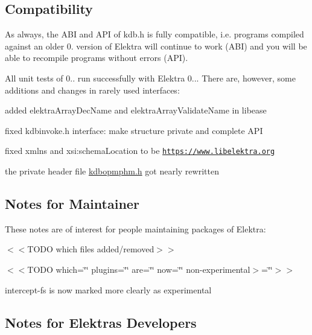 \subsection*{Compatibility}

As always, the A\+BI and A\+PI of kdb.\+h is fully compatible, i.\+e. programs compiled against an older 0. version of Elektra will continue to work (A\+BI) and you will be able to recompile programs without errors (A\+PI).

All unit tests of 0.. run successfully with Elektra 0... There are, however, some additions and changes in rarely used interfaces\+:


\begin{DoxyItemize}
\item added {\ttfamily elektra\+Array\+Dec\+Name} and {\ttfamily elektra\+Array\+Validate\+Name} in libease
\item fixed {\ttfamily kdbinvoke.\+h} interface\+: make structure private and complete A\+PI
\item fixed {\ttfamily xmlns} and {\ttfamily xsi\+:schema\+Location} to be {\ttfamily \href{https://www.libelektra.org}{\tt https\+://www.\+libelektra.\+org}}
\item the private header file {\ttfamily \hyperlink{kdbopmphm_8h}{kdbopmphm.\+h}} got nearly rewritten
\end{DoxyItemize}

\subsection*{Notes for Maintainer}

These notes are of interest for people maintaining packages of Elektra\+:


\begin{DoxyItemize}
\item $<$$<$T\+O\+DO which files added/removed$>$$>$
\item $<$$<$\+T\+O\+D\+O which=\char`\"{}\char`\"{} plugins=\char`\"{}\char`\"{} are=\char`\"{}\char`\"{} now=\char`\"{}\char`\"{} non-\/experimental$>$=\char`\"{}\char`\"{}$>$$>$
\item intercept-\/fs is now marked more clearly as experimental
\end{DoxyItemize}

\subsection*{Notes for Elektra\textquotesingle{}s Developers}

